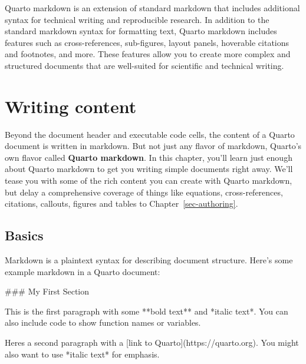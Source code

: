 \documentclass[
  letterpaper,
  DIV=11,
  numbers=noendperiod,
  oneside]{scrreprt}
\newenvironment{Shaded}{\begin{snugshade}}{\end{snugshade}}
\newcommand{\CommentTok}[1]{\textcolor[rgb]{0.37,0.37,0.37}{#1}}
\newcommand{\FunctionTok}[1]{\textcolor[rgb]{0.28,0.35,0.67}{#1}}
\newcommand{\InformationTok}[1]{\textcolor[rgb]{0.37,0.37,0.37}{#1}}
\newcommand{\NormalTok}[1]{\textcolor[rgb]{0.00,0.23,0.31}{#1}}
\newcommand{\OtherTok}[1]{\textcolor[rgb]{0.00,0.23,0.31}{#1}}
\begin{document}
\begin{tcolorbox}
Quarto markdown is an extension of standard markdown that includes
additional syntax for technical writing and reproducible research. In
addition to the standard markdown syntax for formatting text, Quarto
markdown includes features such as cross-references, sub-figures, layout
panels, hoverable citations and footnotes, and more. These features
allow you to create more complex and structured documents that are
well-suited for scientific and technical writing.

\section{Writing content}\label{sec-writing}

Beyond the document header and executable code cells, the content of a
Quarto document is written in markdown. But not just any flavor of
markdown, Quarto's own flavor called \textbf{Quarto markdown}. In this
chapter, you'll learn just enough about Quarto markdown to get you
writing simple documents right away. We'll tease you with some of the
rich content you can create with Quarto markdown, but delay a
comprehensive coverage of things like equations, cross-references,
citations, callouts, figures and tables to Chapter~\ref{sec-authoring}.

\subsection{Basics}\label{basics}

Markdown is a plaintext syntax for describing document structure. Here's
some example markdown in a Quarto document:

\begin{codelisting}[H]

\caption{\texttt{document.qmd}}

\begin{Shaded}
\begin{Highlighting}[]
\FunctionTok{\#\#\# My First Section}

\NormalTok{This is the first paragraph with some **bold text** and *italic text*.}
\NormalTok{You can also include }\InformationTok{\textasciigrave{}code\textasciigrave{}}\NormalTok{ to show function names or variables.}

\NormalTok{Here\textquotesingle{}s a second paragraph with a }\CommentTok{[}\OtherTok{link to Quarto}\CommentTok{](https://quarto.org)}\NormalTok{.}
\NormalTok{You might also want to use *italic text* for emphasis.}
\end{Highlighting}
\end{Shaded}


\end{codelisting}
\end{tcolorbox}
\end{document}
